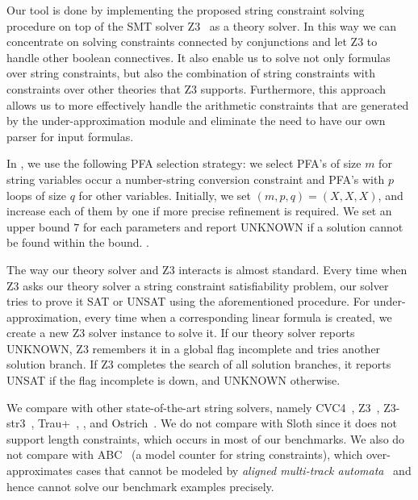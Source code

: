 Our tool {\tool} is done by implementing the proposed string constraint solving procedure on top of the SMT solver Z3~\cite{z3} as a theory solver. In this way we can concentrate on solving constraints connected by conjunctions and let Z3 to handle other boolean connectives. It also enable us to solve not only formulas over string constraints, but also the combination of string constraints with constraints over other theories that Z3 supports. Furthermore, this approach allows us to more effectively handle the arithmetic constraints that are generated by the under-approximation module and eliminate the need to have our own parser for input formulas. 

In {\tool}, we use the following PFA selection strategy: we select PFA's of size $m$ for string variables occur a number-string conversion constraint and PFA's with $p$ loops of size $q$ for other variables. Initially, we set $(m,p,q)=(X,X,X)$, and increase each of them by one if more precise refinement is required. We set an upper bound $7$ for each parameters and report UNKNOWN if a solution cannot be found within the bound. .

The way our theory solver and Z3 interacts is almost standard. Every time when Z3 asks our theory solver a string constraint satisfiability problem, our solver tries to prove it SAT or UNSAT using the aforementioned procedure. For under-approximation, every time when a corresponding linear formula is created, we create a new Z3 solver instance to solve it. If our theory solver reports UNKNOWN, Z3 remembers it in a global flag \textsf{incomplete} and tries another solution branch. If Z3 completes the search of all solution branches, it reports UNSAT if the flag \textsf{incomplete} is down, and UNKNOWN otherwise.

We compare {\tool} with other state-of-the-art string solvers, namely CVC4~\cite{cvc4Tool}, Z3~\cite{z3}, \textsf{Z3-str3}~\cite{zheng2013z3}, \textsf{Trau+}~\cite{parosh2019chain}, , and Ostrich~\cite{chen2019decision}. We do not compare with Sloth \cite{sloth} since it does not support length constraints, which occurs in most of our benchmarks. We also do not compare with ABC~\cite{aydin2018parameterized} (a model counter for string constraints), which over-approximates cases that cannot be modeled by \emph{aligned multi-track automata}~\cite{yu2016optimal} and hence cannot solve our benchmark examples precisely.

